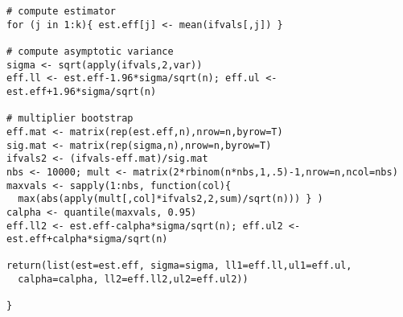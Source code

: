 \documentclass[12pt]{article}
\theoremstyle{remark}
\begin{document}
\begin{verbatim}
# compute estimator
for (j in 1:k){ est.eff[j] <- mean(ifvals[,j]) }

# compute asymptotic variance
sigma <- sqrt(apply(ifvals,2,var))
eff.ll <- est.eff-1.96*sigma/sqrt(n); eff.ul <- est.eff+1.96*sigma/sqrt(n)

# multiplier bootstrap
eff.mat <- matrix(rep(est.eff,n),nrow=n,byrow=T)
sig.mat <- matrix(rep(sigma,n),nrow=n,byrow=T)
ifvals2 <- (ifvals-eff.mat)/sig.mat
nbs <- 10000; mult <- matrix(2*rbinom(n*nbs,1,.5)-1,nrow=n,ncol=nbs)
maxvals <- sapply(1:nbs, function(col){ 
  max(abs(apply(mult[,col]*ifvals2,2,sum)/sqrt(n))) } )
calpha <- quantile(maxvals, 0.95)
eff.ll2 <- est.eff-calpha*sigma/sqrt(n); eff.ul2 <- est.eff+calpha*sigma/sqrt(n)

return(list(est=est.eff, sigma=sigma, ll1=eff.ll,ul1=eff.ul, 
  calpha=calpha, ll2=eff.ll2,ul2=eff.ul2))

}
\end{verbatim}
\end{document}
